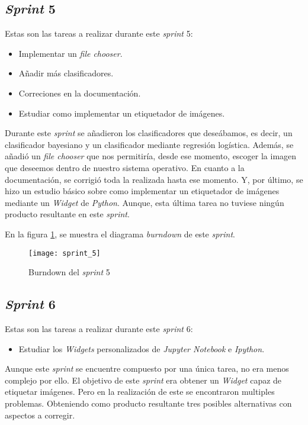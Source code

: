 \subsection{\textit{Sprint} 5}
Estas son las tareas a realizar durante este \textit{sprint} 5:

\begin{itemize}
	\item Implementar un \textit{file chooser}. 
	\item Añadir más clasificadores.
	\item Correciones en la documentación.
	\item Estudiar como implementar un etiquetador de imágenes.
\end{itemize}

Durante este \textit{sprint} se añadieron los clasificadores que deseábamos, es decir, un clasificador bayesiano y un clasificador mediante regresión logística. Además, se añadió un \textit{file chooser} que nos permitiría, desde ese momento, escoger la imagen que deseemos dentro de nuestro sistema operativo. En cuanto a la documentación, se corrigió toda la  realizada hasta ese momento. Y, por último, se hizo un estudio básico sobre como implementar un etiquetador de imágenes mediante un \textit{Widget} de \textit{Python}. Aunque, esta última tarea no tuviese ningún producto resultante en este \textit{sprint}.

En la figura \ref{fig:A.1.6}, se muestra el diagrama \textit{burndown} de este \textit{sprint}.

\begin{figure}
\centering
\texttt{[image: sprint\_5]}
\caption{Burndown del \textit{sprint} 5}
\label{fig:A.1.6}
\end{figure}

\subsection{\textit{Sprint} 6}
Estas son las tareas a realizar durante este \textit{sprint} 6:

\begin{itemize}
	\item Estudiar los \textit{Widgets} personalizados de \textit{Jupyter Notebook} e \textit{Ipython}.
\end{itemize}

Aunque este \textit{sprint} se encuentre compuesto por una única tarea, no era menos complejo por ello. El objetivo de este \textit{sprint} era obtener un \textit{Widget} capaz de etiquetar imágenes. Pero en la realización de este se encontraron multiples problemas. Obteniendo como producto resultante tres posibles alternativas con aspectos a corregir.

